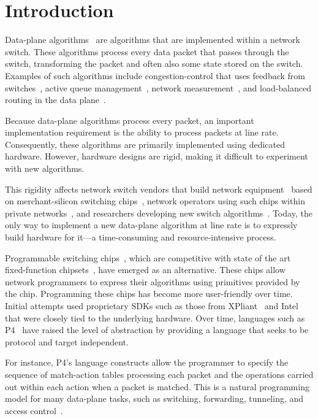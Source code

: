 \section{Introduction}
\label{s:intro}

Data-plane algorithms~\cite{cestan} are algorithms that are implemented within
a network switch. These algorithms process every data packet that passes
through the switch, transforming the packet and often also some state stored on
the switch.  Examples of such algorithms include congestion-control that uses
feedback from switches~\cite{xcp, rcp, pdq, dctcp}, active queue
management~\cite{codel}, network measurement~\cite{opensketch, bitmap_george,
elephant_george}, and load-balanced routing in the data plane~\cite{conga}.

Because data-plane algorithms process every packet, an important implementation
requirement is the ability to process packets at line rate.  Consequently,
these algorithms are primarily implemented using dedicated hardware. However,
hardware designs are rigid, making it difficult to experiment with new
algorithms.

This rigidity affects network switch vendors that build network
equipment~\cite{cisco_nexus, dell_force10, arista_7050} based on
merchant-silicon switching chips~\cite{trident, tomahawk, mellanox}, network
operators using such chips within private networks~\cite{google,facebook,vl2},
and researchers developing new switch algorithms~\cite{xcp, codel, d3, detail,
pdq}. Today, the only way to implement a new data-plane algorithm at line rate
is to expressly build hardware for it---a time-consuming and resource-intensive
process.

Programmable switching chips~\cite{flexpipe, xpliant, rmt}, which are
competitive with state of the art fixed-function chipsets~\cite{trident,
tomahawk, mellanox}, have emerged as an alternative.  These chips allow network
programmers to express their algorithms using primitives provided by the chip.
Programming these chips has become more user-friendly over time. Initial
attempts used proprietary SDKs such as those from XPliant~\cite{xpliant_sdk,
xpliant_sdk2} and Intel~\cite{intel_sdk} that were closely tied to the
underlying hardware.  Over time, languages such as P4~\cite{p4, p4spec} have
raised the level of abstraction by providing a language that seeks to be
protocol and target independent.

For instance, P4's language constructs allow the programmer to specify the
sequence of match-action tables processing each packet and the operations
carried out within each action when a packet is matched. This is a natural
programming model for many data-plane tasks, such as switching, forwarding,
tunneling, and access control~\cite{dc_p4}.

